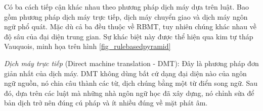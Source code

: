 Có ba cách tiếp cận khác nhau theo phương pháp dịch máy dựa trên luật. Bao gồm phương pháp dịch máy trực tiếp, dịch máy chuyển giao và dịch máy ngôn ngữ phổ quát. Mặc dù cả ba đều thuộc về RBMT, tuy nhiên chúng khác nhau về độ sâu của đại diện trung gian. Sự khác biệt này được thể hiện qua kim tự tháp Vauquois, minh họa trên hình \ref{fig_rulebasedpyramid} 

\textit{Dịch máy trực tiếp} (Direct machine translation - DMT): Đây là phương pháp đơn giản nhất của dịch máy. DMT không dùng bất cứ dạng đại diện nào của ngôn ngữ nguồn, nó chia câu thành các từ, dịch chúng bằng một từ điển song ngữ. Sau đó, dựa trên các luật mà những nhà ngôn ngữ học đã xây dựng, nó chỉnh sửa để bản dịch trở nên đúng cú pháp và ít nhiều đúng về mặt phát âm.

